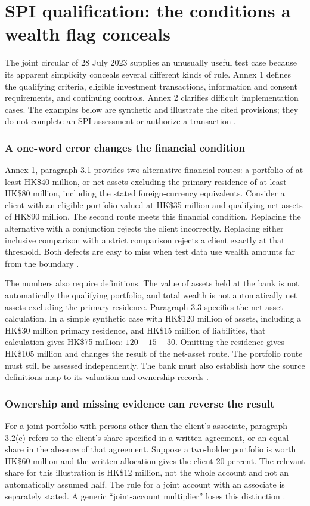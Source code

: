 \documentclass[12pt,a4paper,oneside,openany]{book}
\newcommand{\caseheading}[1]{\subsubsection*{#1}}
\begin{document}
\section{SPI qualification: the conditions a wealth flag conceals}
\label{merge:P-01-problem:02}

\label{sec:spi}

The joint circular of 28 July 2023 supplies an unusually useful test case because
its apparent simplicity conceals several different kinds of rule. Annex 1
defines the qualifying criteria, eligible investment transactions, information
and consent requirements, and continuing controls. Annex 2 clarifies difficult
implementation cases. The examples below are synthetic and illustrate the cited
provisions; they do not complete an SPI assessment or authorize a transaction
\citep{sfcspi,sfcspiannex1,sfcspiannex2}.

\caseheading{A one-word error changes the financial condition}
Annex 1, paragraph 3.1 provides two alternative financial routes: a portfolio of
at least HK\$40 million, or net assets excluding the primary residence of at least
HK\$80 million, including the stated foreign-currency equivalents. Consider a
client with an eligible portfolio valued at HK\$35 million and qualifying net
assets of HK\$90 million. The second route meets this financial condition.
Replacing the alternative with a conjunction rejects the client incorrectly.
Replacing either inclusive comparison with a strict comparison rejects a client
exactly at that threshold. Both defects are easy to miss when test data use
wealth amounts far from the boundary \citep[Annex 1, para.~3.1]{sfcspiannex1}.

The numbers also require definitions. The value of assets held at the bank is
not automatically the qualifying portfolio, and total wealth is not automatically
net assets excluding the primary residence. Paragraph 3.3 specifies the net-asset
calculation. In a simple synthetic case with HK\$120 million of assets, including
a HK\$30 million primary residence, and HK\$15 million of liabilities, that
calculation gives HK\$75 million: $120-15-30$. Omitting the residence gives
HK\$105 million and changes the result of the net-asset route. The portfolio
route must still be assessed independently. The bank must also establish how the
source definitions map to its valuation and ownership records
\citep[Annex 1, paras.~3.2--3.4]{sfcspiannex1}.

\caseheading{Ownership and missing evidence can reverse the result}
For a joint portfolio with persons other than the client's associate, paragraph
3.2(c) refers to the client's share specified in a written agreement, or an equal
share in the absence of that agreement. Suppose a two-holder portfolio is worth
HK\$60 million and the written allocation gives the client 20 percent. The
relevant share for this illustration is HK\$12 million, not the whole account
and not an automatically assumed half. The rule for a joint account with an
associate is separately stated. A generic ``joint-account multiplier'' loses
this distinction \citep[Annex 1, para.~3.2]{sfcspiannex1}.
\end{document}
